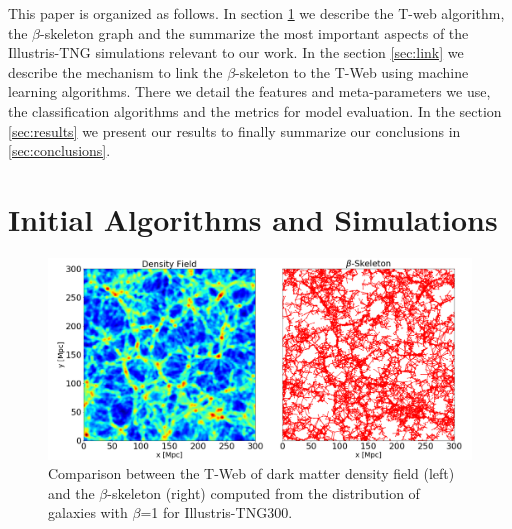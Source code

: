 \documentclass[usenatbib]{mnras}
\begin{document}
This paper is organized as follows. 
In section \ref{sec:init} we describe the T-web algorithm,
the $\beta$-skeleton graph and the summarize the most important
aspects of the Illustris-TNG simulations relevant to our work.
In the section \ref{sec:link} we
describe the mechanism to link the $\beta$-skeleton to the T-Web
using machine learning algorithms. 
There we detail the features and meta-parameters we use, the
classification algorithms and the metrics for model evaluation. 
In the section \ref{sec:results} we present our results
to finally summarize our conclusions in \ref{sec:conclusions}.


\section{Initial Algorithms and Simulations}\label{sec:init}

\begin{figure}
\centering
 \includegraphics[scale=0.28]{Figs/Fig1_.png}%
 \caption{Comparison between the T-Web of dark matter density field (left) and the $\beta$-skeleton (right) computed from the distribution of galaxies with $\beta$=1 for Illustris-TNG300.}
 \label{fig:TWebBsk}
\end{figure}
\end{document}
